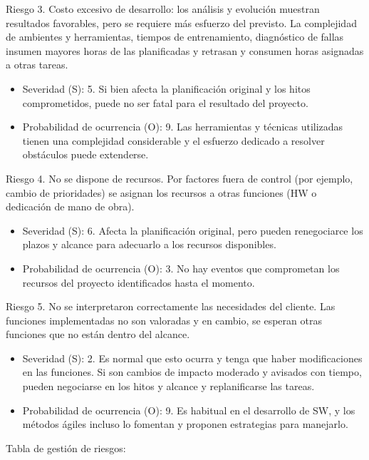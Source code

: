 \documentclass[11pt]{charter}
\begin{document}
Riesgo 3. Costo excesivo de desarrollo: los análisis y evolución muestran resultados favorables, pero se requiere más esfuerzo del previsto. La complejidad de ambientes y herramientas, tiempos de entrenamiento, diagnóstico de fallas insumen mayores horas de las planificadas y retrasan y consumen horas asignadas a otras tareas.
\begin{itemize}
	\item Severidad (S): 5. Si bien afecta la planificación original y los hitos comprometidos, puede no ser fatal para el resultado del proyecto.
	\item Probabilidad de ocurrencia (O): 9. Las herramientas y técnicas utilizadas tienen una complejidad considerable y el esfuerzo dedicado a resolver obstáculos puede extenderse.
\end{itemize}

Riesgo 4. No se dispone de recursos. Por factores fuera de control (por ejemplo, cambio de prioridades) se asignan los recursos a otras funciones (HW o dedicación de mano de obra).
\begin{itemize}
	\item Severidad (S): 6. Afecta la planificación original, pero pueden renegociarce los plazos y alcance para adecuarlo a los recursos disponibles.
	\item Probabilidad de ocurrencia (O): 3. No hay eventos que comprometan los recursos del proyecto identificados hasta el momento.
\end{itemize}

Riesgo 5. No se interpretaron correctamente las necesidades del cliente. Las funciones implementadas no son valoradas y en cambio, se esperan otras funciones que no están dentro del alcance.
\begin{itemize}
	\item Severidad (S): 2. Es normal que esto ocurra y tenga que haber modificaciones en las funciones. Si son cambios de impacto moderado y avisados con tiempo, pueden negociarse en los hitos y alcance y replanificarse las tareas.
	\item Probabilidad de ocurrencia (O): 9. Es habitual en el desarrollo de SW, y los métodos ágiles incluso lo fomentan y proponen estrategias para manejarlo.
\end{itemize}

Tabla de gestión de riesgos:
\end{document}
